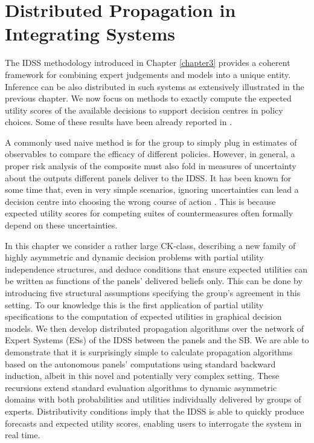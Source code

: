 
\chapter{Distributed Propagation in Integrating Systems} 

\label{chapter4} %


The IDSS methodology introduced in Chapter \ref{chapter3} provides a coherent framework for combining expert judgements and models into a unique entity. Inference can be also distributed in such systems as extensively illustrated in the previous chapter. We now focus on methods to exactly compute the expected utility scores of the available decisions to support decision centres in policy choices. Some of these results have been already reported in \citet{Leonelli2015}.

A commonly used naive method is for the group to simply plug in estimates of observables to compare the efficacy of different policies. However, in general, a proper risk analysis of the composite must also fold in measures of uncertainty about the outputs different panels deliver to the IDSS. It has been known for some time that, even in very simple scenarios, ignoring uncertainties can lead a decision centre into choosing the wrong course of action \citep[see e.g.][and the examples of Section \ref{sec:exalgo}]{Leonelli2013}. This is because expected utility scores for competing suites of countermeasures often formally depend on these uncertainties. 

In this chapter we consider a rather large CK-class, describing a new family of highly asymmetric and dynamic decision problems with partial utility independence structures, and deduce conditions that ensure expected utilities can be written as functions of the panels' delivered beliefs only.  This can be done by introducing five structural assumptions specifying the group's agreement in this setting. To our knowledge this is the first application of partial utility specifications to the computation of expected utilities in graphical decision models.  We  then develop distributed propagation algorithms over the network of Expert Systems (ESs) of the IDSS between the panels and the SB. We are able to demonstrate that it is surprisingly simple to calculate propagation algorithms based on the autonomous panels' computations using standard backward induction, albeit in this novel and potentially very complex setting. These recursions extend standard evaluation algorithms to dynamic asymmetric domains with both probabilities and utilities individually delivered by groups of experts. Distributivity conditions  imply that the IDSS is able to quickly produce forecasts and expected utility scores, enabling users to interrogate the system in real time. 

